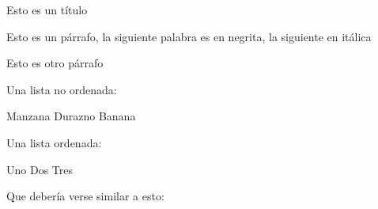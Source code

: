 \documentclass[letterpaper,10pt,spanish]{sphinxmanual}
\begin{document}
%
\begin{sphinxVerbatim}[commandchars=\\\{\}]
Esto es un título

Esto es un párrafo, la siguiente palabra es en negrita, la siguiente en itálica

Esto es otro párrafo

  Una lista no ordenada:

  Manzana
  Durazno
  Banana


Una lista ordenada:

  Uno
  Dos
  Tres
\end{sphinxVerbatim}

Que debería verse similar a esto:

\begin{figure}[htbp]
\centering

\noindent{}
\end{figure}
\end{document}
